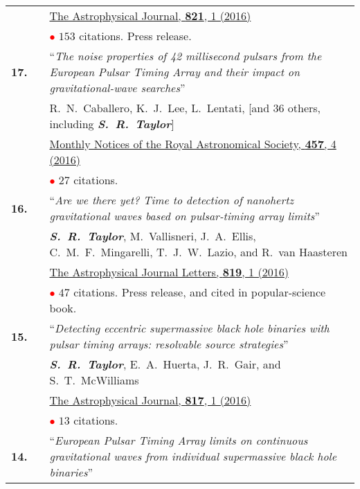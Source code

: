 \documentclass[11pt,letterpaper,sans]{moderncv}
\begin{document}
{\begin{longtable}{rp{0.3cm}p{15.8cm}}
&&  \href{http://iopscience.iop.org/article/10.3847/0004-637X/821/1/13/meta}{{\color{color1} The Astrophysical Journal, \textbf{821}, 1 (2016)}} \\
&& \textcolor{red}{$\bullet$} $153$ citations. Press release. \vspace{0.09cm}\\
\textbf{17.} & & ``\textit{The noise properties of 42 millisecond pulsars from the European Pulsar Timing Array and their impact on gravitational-wave searches}'' \\ 
&& R.~N.~Caballero, K.~J.~Lee, L.~Lentati, [and 36 others, including \textit{\textbf{S.~R.~Taylor}}] \\ 
&&  \href{http://mnras.oxfordjournals.org/content/457/4/4421}{{\color{color1} Monthly Notices of the Royal Astronomical Society, \textbf{457}, 4 (2016)}} \\
&& \textcolor{red}{$\bullet$} $27$ citations. \vspace{0.09cm}\\
\textbf{16.} & & ``\textit{Are we there yet? Time to detection of nanohertz gravitational waves based on pulsar-timing array limits}'' \\ 
&& \textit{\textbf{S.~R.~Taylor}}, M.~Vallisneri, J.~A.~Ellis, C.~M.~F.~Mingarelli, T.~J.~W.~Lazio, and R.~van Haasteren \\ 
&&  \href{http://iopscience.iop.org/article/10.3847/2041-8205/819/1/L6/meta}{{\color{color1} The Astrophysical Journal Letters, \textbf{819}, 1 (2016)}} \\
&& \textcolor{red}{$\bullet$} $47$ citations. Press release, and cited in popular-science book. \vspace{0.09cm}\\
\textbf{15.} & & ``\textit{Detecting eccentric supermassive black hole binaries with pulsar timing arrays: resolvable source strategies}'' \\ 
&& \textit{\textbf{S.~R.~Taylor}}, E.~A.~Huerta, J.~R.~Gair, and S.~T.~McWilliams \\ 
&& \href{http://iopscience.iop.org/article/10.3847/0004-637X/817/1/70/meta}{{\color{color1} The Astrophysical Journal, \textbf{817}, 1 (2016)}} \\
&& \textcolor{red}{$\bullet$} $13$ citations. \vspace{0.09cm}\\
\textbf{14.} & & ``\textit{European Pulsar Timing Array limits on continuous gravitational waves from individual supermassive black hole binaries}'' \\ 

\end{longtable}}
\end{document}
